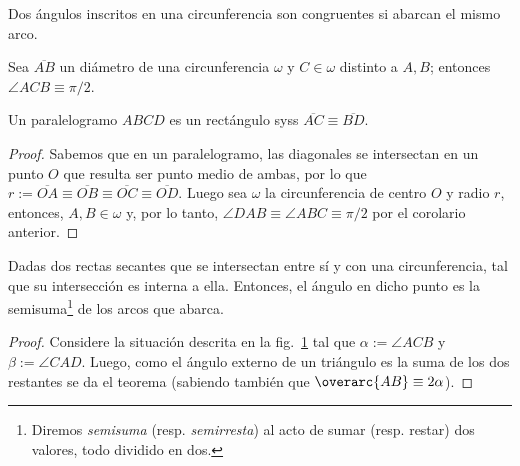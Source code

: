 \documentclass[11pt,a4paper]{book}
\begin{document}
\begin{cor}
Dos ángulos inscritos en una circunferencia son congruentes si abarcan el mismo arco.
\end{cor}
\begin{cor}
	Sea $\overline{AB}$ un diámetro de una circunferencia $\omega$ y $C\in\omega$ distinto a $A,B$; entonces $\angle ACB\equiv\pi/2$.
\end{cor}
\begin{cor}
	Un paralelogramo $ABCD$ es un rectángulo syss $\overline{AC}\equiv\overline{BD}$.
\end{cor}
\begin{proof}
	Sabemos que en un paralelogramo, las diagonales se intersectan en un punto $O$ que resulta ser punto medio de ambas, por lo que $r:=\overline{OA}\equiv\overline{OB}\equiv\overline{OC}\equiv\overline{OD}$. Luego sea $\omega$ la circunferencia de centro $O$ y radio $r$, entonces, $A,B\in\omega$ y, por lo tanto, $\angle DAB\equiv\angle ABC\equiv\pi/2$ por el corolario anterior.
\end{proof}
\begin{figure}
	\centering
	\caption{}
	\label{fig:inscribed-arc-equity}
\end{figure}
\begin{thm}
	Dadas dos rectas secantes que se intersectan entre sí y con una circunferencia, tal que su intersección es interna a ella. Entonces, el ángulo en dicho punto es la semisuma\footnote{Diremos \textit{semisuma} (resp. \textit{semirresta}) al acto de sumar (resp. restar) dos valores, todo dividido en dos.} de los arcos que abarca.
\end{thm}
\begin{proof}
	Considere la situación descrita en la fig.~\ref{fig:inscribed-arc-equity} tal que $\alpha:=\angle ACB$ y $\beta:=\angle CAD$. Luego, como el ángulo externo de un triángulo es la suma de los dos restantes se da el teorema (sabiendo también que $\overarc{AB}\equiv 2\alpha$).
\end{proof}
\end{document}
